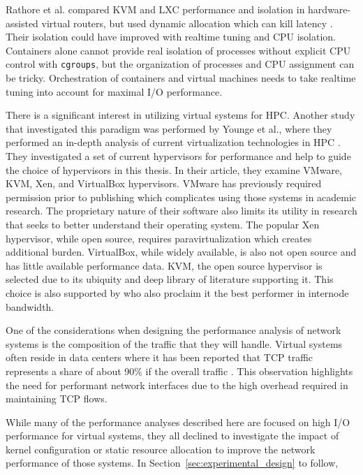 Rathore et al. compared KVM and LXC performance and isolation in hardware-assisted virtual routers, but used dynamic allocation which can kill latency \autocite{rathore2013kvm}.
Their isolation could have improved with realtime tuning and CPU isolation.  
Containers alone cannot provide real isolation of processes without explicit CPU control with \texttt{cgroups}, but the organization of processes and CPU assignment can be tricky.
Orchestration of containers and virtual machines needs to take realtime tuning into account for maximal I/O performance.

There is a significant interest in utilizing virtual systems for HPC.  Another study that investigated this paradigm was performed by Younge et al., where they performed an in-depth analysis of current virtualization technologies in HPC \autocite{_younge_1}.
They investigated a set of current hypervisors for performance and help to guide the choice of hypervisors in this thesis. 
In their article, they examine VMware, KVM, Xen, and VirtualBox hypervisors. 
VMware has previously required permission prior to publishing which complicates using those systems in academic research.  
The proprietary nature of their software also limits its utility in research that seeks to better understand their operating system.  
The popular Xen hypervisor, while open source, requires paravirtualization which creates additional burden.
VirtualBox, while widely available, is also not open source and has little available performance data.  
KVM, the open source hypervisor is selected due to its ubiquity and deep library of literature supporting it.
This choice is also supported by \autocite{_younge_1} who also proclaim it the best performer in internode bandwidth.  

One of the considerations when designing the performance analysis of network systems is the composition of the traffic that they will handle.  
Virtual systems often reside in data centers where it has been reported that TCP traffic represents a share of about 90\% if the overall traffic \autocite{haTCPCloud2013}.
This observation highlights the need for performant network interfaces due to the high overhead required in maintaining TCP flows.

While many of the performance analyses described here are focused on high I/O performance for virtual systems, they all declined to investigate the impact of kernel configuration or static resource allocation to improve the network performance of those systems.  
In Section~\ref{sec:experimental_design} to follow, 



\nocite{_dpdk_1, _adams_1, _chowdhury_1, _grinberg_1, rathore2013kvm, seo2014performance, gomes2014performance, kivity2014osv, wang2011understanding}

